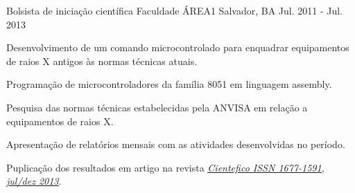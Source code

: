 

\begin{cventries}

  \cventry
    {Bolsista de iniciação científica} %
    {Faculdade ÁREA1} %
    {Salvador, BA} %
    {Jul. 2011 - Jul. 2013} %
    {
      \begin{cvitems} %
        \item {Desenvolvimento de um comando microcontrolado para enquadrar equipamentos de raios X antigos às normas técnicas atuais.}
        \item {Programação de microcontroladores da família 8051 em linguagem assembly.}
        \item {Pesquisa das normas técnicas estabelecidas pela ANVISA em relação a equipamentos de raios X.}
        \item {Apresentação de relatórios mensais com as atividades desenvolvidas no período.}
        \item {Puplicação dos resultados em artigo na revista \underline{\href{https://cientefico.emnuvens.com.br/cientefico/article/view/58}{\emph{Cientefico ISSN 1677-1591, jul/dez 2013}}}.}
      \end{cvitems}
    }

\end{cventries}

